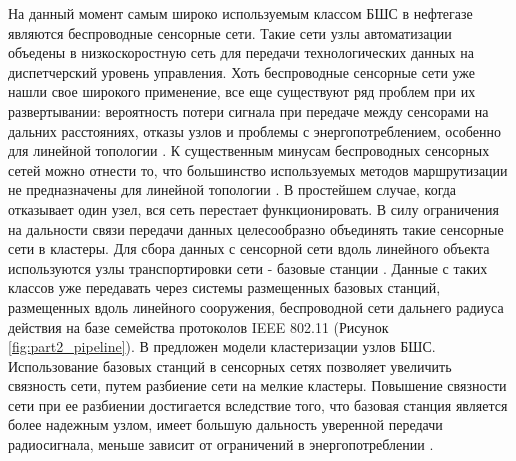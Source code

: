 



На данный момент самым широко используемым классом БШС в нефтегазе являются беспроводные сенсорные сети. Такие сети узлы автоматизации  объедены в низкоскоростную сеть для передачи технологических данных на диспетчерский уровень управления. Хоть беспроводные сенсорные сети уже нашли свое широкого применение, все еще существуют ряд проблем при их развертывании: вероятность потери сигнала при передаче между сенсорами на дальних расстояниях, отказы узлов и проблемы с энергопотреблением, особенно для линейной топологии \cite{Lee2020}. К существенным минусам беспроводных сенсорных сетей можно отнести то, что большинство используемых методов маршрутизации не предназначены для линейной топологии \cite{Abbas2018}. В простейшем случае, когда отказывает один узел, вся сеть перестает функционировать. В силу ограничения на дальности связи передачи данных  целесообразно объединять такие сенсорные сети в кластеры. Для сбора данных с сенсорной сети вдоль линейного объекта используются узлы транспортировки сети -  базовые станции \cite{Fataliyev2018}. Данные с таких классов уже передавать через системы размещенных базовых станций, размещенных вдоль линейного сооружения, беспроводной сети дальнего радиуса действия на базе семейства протоколов IEEE 802.11 (Рисунок \ref{fig:part2_pipeline}).  В \cite{Li2020, Albaseer2019} предложен модели кластеризации узлов БШС. Использование базовых станций в сенсорных сетях позволяет увеличить связность сети, путем разбиение сети на мелкие кластеры. Повышение связности сети при ее разбиении достигается вследствие того, что базовая станция является более надежным узлом, имеет большую дальность уверенной передачи радиосигнала, меньше зависит от ограничений в энергопотреблении \cite{Krasnov2016}. 

